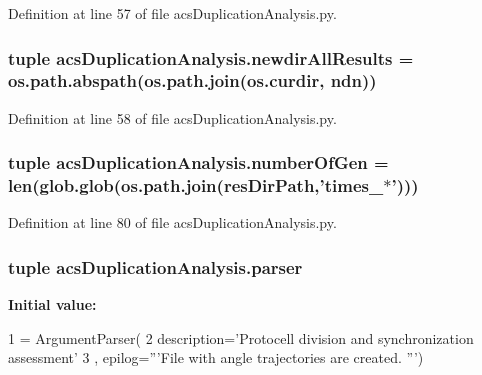 Definition at line 57 of file acs\-Duplication\-Analysis.\-py.

\hypertarget{a00094_a78f5a1cb54411a11cc368302aac35ca9}{
\subsubsection[{newdir\-All\-Results}]{\setlength{\rightskip}{0pt plus 5cm}tuple acs\-Duplication\-Analysis.\-newdir\-All\-Results = os.\-path.\-abspath(os.\-path.\-join(os.\-curdir, {\bf ndn}))}}\label{a00094_a78f5a1cb54411a11cc368302aac35ca9}


Definition at line 58 of file acs\-Duplication\-Analysis.\-py.

\hypertarget{a00094_a4db9785401a572b6067cabb96b3c5ecd}{
\subsubsection[{number\-Of\-Gen}]{\setlength{\rightskip}{0pt plus 5cm}tuple acs\-Duplication\-Analysis.\-number\-Of\-Gen = len(glob.\-glob(os.\-path.\-join({\bf res\-Dir\-Path},'times\-\_\-$\ast$')))}}\label{a00094_a4db9785401a572b6067cabb96b3c5ecd}


Definition at line 80 of file acs\-Duplication\-Analysis.\-py.

\hypertarget{a00094_afa045b1b79e3cc0d0ff252ca426a9976}{
\subsubsection[{parser}]{\setlength{\rightskip}{0pt plus 5cm}tuple acs\-Duplication\-Analysis.\-parser}}\label{a00094_afa045b1b79e3cc0d0ff252ca426a9976}
{\bfseries Initial value\-:}
\begin{DoxyCode}
1 = ArgumentParser(
2                                 description=\textcolor{stringliteral}{'Protocell division and synchronization assessment'}
3                                 , epilog=\textcolor{stringliteral}{'''File with angle trajectories are created. '''})
\end{DoxyCode}


